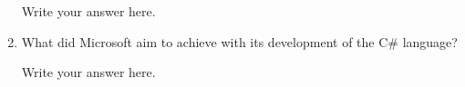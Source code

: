\begin{enumerate}
  \begin{answer}

    Write your answer here.

    \end{answer}

  \item What did Microsoft aim to achieve with its development of the
    C\# language?

  \begin{answer}

    Write your answer here.

    \end{answer}

  \end{enumerate}


